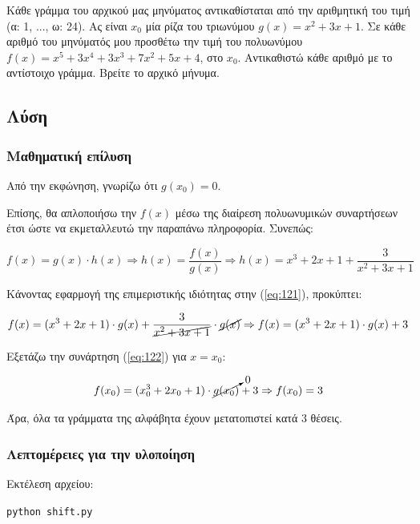 \documentclass[oneside]{article}
\let\t\texttt
\begin{document}
Κάθε γράμμα του αρχικού μας μηνύματος αντικαθίσταται από την αριθμητική του τιμή (α: 1, ..., ω: 24). Ας είναι $x_0$ μία ρίζα του τριωνύμου $g(x) = x^2 + 3x + 1$. Σε κάθε αριθμό του μηνύματός μου προσθέτω την τιμή του πολυωνύμου $f(x) = x^5 + 3x^4 + 3x^3 + 7x^2 + 5x + 4$, στο $x_0$. Αντικαθιστώ κάθε αριθμό με το αντίστοιχο γράμμα. Βρείτε το αρχικό μήνυμα.

\subsection{Λύση}

\subsubsection{Μαθηματική επίλυση}

Από την εκφώνηση, γνωρίζω ότι $g(x_0) = 0$. 

Επίσης, θα απλοποιήσω την $f(x)$ μέσω της διαίρεση πολυωνυμικών συναρτήσεων έτσι ώστε να εκμεταλλευτώ την παραπάνω πληροφορία. Συνεπώς: 

\begin{equation} \label{eq:121}
    f(x) = g(x) \cdot h(x) \Rightarrow h(x) = \frac{f(x)}{g(x)} \Rightarrow h(x) = x^3+2x+1+\frac{3}{x^2+3x+1}
\end{equation}

Κάνοντας εφαρμογή της επιμεριστικής ιδιότητας στην (\ref{eq:121}), προκύπτει: 

\begin{equation} \label{eq:122}
    f(x) = (x^3+2x+1)\cdot g(x) + \frac{3}{\cancel{x^2+3x+1}}\cdot \cancel{g(x)} \Rightarrow f(x) = (x^3+2x+1) \cdot g(x) + 3
\end{equation}

Εξετάζω την συνάρτηση (\ref{eq:122}) για $x = x_0$:

\begin{equation} \label{eq:123}
    f(x_0) = (x_{0}^3+2x_0+1) \cdot \cancelto{0}{g(x_0)} + 3 \Rightarrow f(x_0) = 3
\end{equation}

Άρα, όλα τα γράμματα της αλφάβητα έχουν μετατοπιστεί κατά 3 θέσεις.

\subsubsection{Λεπτομέρειες για την υλοποίηση}

Εκτέλεση αρχείου:

\begin{center}
    \t{python shift.py}
\end{center}
\end{document}
